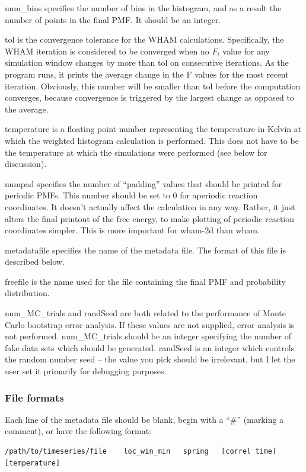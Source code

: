 \documentclass[12pt]{article}
\begin{document}
num\_bins specifies the number of bins in the histogram, and as a result the
number of points in the final PMF.  It should be an integer.

tol is the convergence tolerance for the WHAM calculations.  Specifically,
the WHAM iteration is considered to be converged when no $F_i$ value for any
simulation window changes by more than tol on consecutive iterations.  As
the program runs, it prints the average change in the F values for the most
recent iteration.  Obviously, this number will be smaller than tol
before the computation converges, because convergence is triggered by the
largest change as opposed to the average.

temperature is a floating point number representing the temperature in
Kelvin at which the weighted histogram calculation is performed.  This does
not have to be the temperature at which the simulations were performed (see
below for discussion).

numpad specifies the number of ``padding'' values that should be printed for
periodic PMFs.  This number should be set to 0 for aperiodic reaction
coordinates.  It doesn't actually affect the calculation in any way.
Rather, it just alters the final printout of the free energy, to make
plotting of periodic reaction coordinates simpler.  This is more important
for wham-2d than wham.

metadatafile specifies the name of the metadata file.  The format of this
file is described below.

freefile is the name used for the file containing the final PMF and
probability distribution.

num\_MC\_trials and randSeed are both related to the performance of Monte
Carlo bootstrap error analysis.  If these values are not supplied, error
analysis is not performed.  num\_MC\_trials should be an integer specifying
the number of fake data sets which should be generated.  randSeed is an
integer which controls the random number seed -- the value you pick should
be irrelevant, but I let the user set it primarily for debugging purposes.

\subsubsection{File formats}
\label{ss:format}

Each line of the metadata file should be blank, begin with a ``\#'' (marking a 
comment), or have the following format:

\begin{footnotesize}
\begin{verbatim}
/path/to/timeseries/file    loc_win_min   spring   [correl time] [temperature]
\end{verbatim}
\end{footnotesize}
\end{document}
